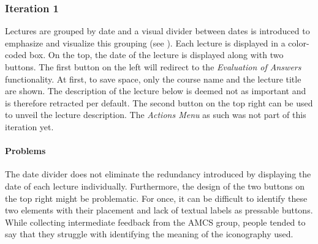 \subsubsection{Iteration 1}
Lectures are grouped by date and a visual divider between dates is introduced to emphasize and visualize this grouping (see ). Each lecture is displayed in a color-coded box. On the top, the date of the lecture is displayed along with two buttons. The first button on the left will redirect to the \emph{Evaluation of Answers} functionality. 
At first, to save space, only the course name and the lecture title are shown. The description of the lecture below is deemed not as important and is therefore retracted per default. The second button on the top right can be used to unveil the lecture description.
The \emph{Actions Menu} as such was not part of this iteration yet.

\paragraph{Problems}
The date divider does not eliminate the redundancy introduced by displaying the date of each lecture individually.
Furthermore, the design of the two buttons on the top right might be problematic. For once, it can be difficult to identify these two elements with their placement and lack of textual labels as pressable buttons. While collecting intermediate feedback from the AMCS group, people tended to say that they struggle with identifying the meaning of the iconography used. 

